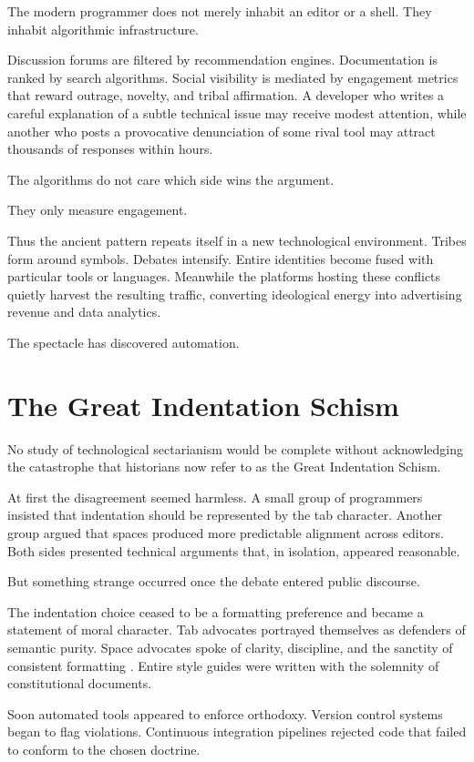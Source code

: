 \documentclass[12pt]{article}
\theoremstyle{definition}
\begin{document}
The modern programmer does not merely inhabit an editor or a shell. They
inhabit algorithmic infrastructure.

Discussion forums are filtered by recommendation engines. Documentation
is ranked by search algorithms. Social visibility is mediated by
engagement metrics that reward outrage, novelty, and tribal affirmation.
A developer who writes a careful explanation of a subtle technical issue
may receive modest attention, while another who posts a provocative
denunciation of some rival tool may attract thousands of responses
within hours.

The algorithms do not care which side wins the argument.

They only measure engagement.

Thus the ancient pattern repeats itself in a new technological
environment. Tribes form around symbols. Debates intensify. Entire
identities become fused with particular tools or languages. Meanwhile
the platforms hosting these conflicts quietly harvest the resulting
traffic, converting ideological energy into advertising revenue and
data analytics.

The spectacle has discovered automation.

\section{The Great Indentation Schism}

No study of technological sectarianism would be complete without
acknowledging the catastrophe that historians now refer to as the Great
Indentation Schism.

At first the disagreement seemed harmless. A small group of programmers
insisted that indentation should be represented by the tab character.
Another group argued that spaces produced more predictable alignment
across editors. Both sides presented technical arguments that, in
isolation, appeared reasonable.

But something strange occurred once the debate entered public discourse.

The indentation choice ceased to be a formatting preference and became
a statement of moral character. Tab advocates portrayed themselves as
defenders of semantic purity. Space advocates spoke of clarity,
discipline, and the sanctity of consistent formatting \cite{knuth1984}.
Entire style guides were written with the solemnity of constitutional
documents.

Soon automated tools appeared to enforce orthodoxy. Version control
systems began to flag violations. Continuous integration pipelines
rejected code that failed to conform to the chosen doctrine.
\end{document}
